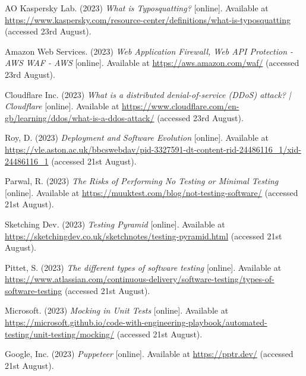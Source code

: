  \noindent [51] AO Kaspersky Lab. (2023) \textit{What is Typosquatting?} [online]. Available at \url{https://www.kaspersky.com/resource-center/definitions/what-is-typosquatting} (accessed 23rd August).
 \vspace{0.2cm}

 \noindent [52] Amazon Web Services. (2023) \textit{Web Application Firewall, Web API Protection - AWS WAF - AWS} [online]. Available at \url{https://aws.amazon.com/waf/} (accessed 23rd August).
 \vspace{0.2cm}

 \noindent [53] Cloudflare Inc. (2023) \textit{What is a distributed denial-of-service (DDoS) attack? | Cloudflare} [online]. Available at \url{https://www.cloudflare.com/en-gb/learning/ddos/what-is-a-ddos-attack/} (accessed 23rd August).
 \vspace{0.2cm}

 \noindent [54] Roy, D. (2023) \textit{Deployment and Software Evolution} [online]. Available at \url{https://vle.aston.ac.uk/bbcswebdav/pid-3327591-dt-content-rid-24486116_1/xid-24486116_1} (accessed 21st August).
 \vspace{0.2cm}

 \noindent [55] Parwal, R. (2023) \textit{The Risks of Performing No Testing or Minimal Testing} [online]. Available at \url{https://muuktest.com/blog/not-testing-software/} (accessed 21st August).
 \vspace{0.2cm}

 \noindent [56] Sketching Dev. (2023) \textit{Testing Pyramid} [online]. Available at \url{https://sketchingdev.co.uk/sketchnotes/testing-pyramid.html} (accessed 21st August).
 \vspace{0.2cm}

 \noindent [57] Pittet, S. (2023) \textit{The different types of software testing} [online]. Available at \url{https://www.atlassian.com/continuous-delivery/software-testing/types-of-software-testing} (accessed 21st August).
 \vspace{0.2cm}

 \noindent [58] Microsoft. (2023) \textit{Mocking in Unit Tests} [online]. Available at \url{https://microsoft.github.io/code-with-engineering-playbook/automated-testing/unit-testing/mocking/} (accessed 21st August).
 \vspace{0.2cm}

 \noindent [59] Google, Inc. (2023) \textit{Puppeteer} [online]. Available at \url{https://pptr.dev/} (accessed 21st August).
 \vspace{0.2cm}

